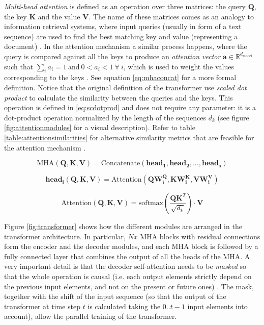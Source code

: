  \textit{Multi-head attention} is defined as an operation over three matrices: the query $\mathbf{Q}$, the key $\mathbf{K}$ and the value $\mathbf{V}$. The name of these matrices comes as an analogy to information retrieval systems, where input queries (usually in form of a text sequence) are used to find the best matching key and value (representing a document) \autocite{manning2008}. In the attention mechanism a similar process happens, where the query is compared against all the keys to produce an \textit{attention vector} $\mathbf{a} \in \mathbb{R}^{d_{\mathrm{model}}}$ such that $\sum_{i} a_i = 1\ \mathrm{and}\ 0<a_i<1\ \forall\ i$, which is used to weight the values corresponding to the keys \autocite{vaswani2017}. See equation \ref{eq:mhaconcat} for a more formal definition. Notice that the original definition of the transformer \autocite{vaswani2017} use \textit{scaled dot product}  to calculate the similarity between the queries and the keys. This operation is defined in \ref{eq:scdotprod} and does not require any parameter: it is a dot-product operation normalized by the length of the sequences $d_k$ (see figure \ref{fig:attentionmodules} for a visual description). Refer to table \ref{table:attentionsimilarities} for alternative similarity metrics that are feasible for the attention mechanism \autocite{uday2019}.

 \begin{equation}
 \label{eq:mhaconcat}
 \mathrm{MHA}(\mathbf{Q, K, V}) = \mathrm{Concatenate}(\mathrm{\mathbf{head_1}},\mathrm{\mathbf{head_2}},...,\mathrm{\mathbf{head_s}})
 \end{equation}


 \begin{equation}
 \label{eq:headsdef}
 \mathrm{\mathbf{head_i}}(\mathbf{Q,K,V}) = \mathrm{Attention}(\mathbf{Q} \mathbf{W^Q_i}, \mathbf{K} \mathbf{W^K_i}, \mathbf{V} \mathbf{W^V_i})
 \end{equation}

 \begin{equation}
 \label{eq:scdotprod}
 \mathrm{Attention}(\mathbf{Q, K, V}) = \mathrm{softmax} \left(\frac{\mathbf{QK}^T}{\sqrt{d_k}}\right) \cdot \mathbf{V}
 \end{equation}



Figure \ref{fig:transformer} shows how the different modules are arranged in the transformer architecture. In particular, $Nx$ MHA blocks with residual connections form the encoder and the decoder modules, and each MHA block is followed by a fully connected layer that combines the output of all the heads of the MHA. A very important detail is that the decoder self-attention needs to be \textit{masked} so that the whole operation is causal (i.e. each output elements strictly depend on the previous input elements, and not on the present or future ones) \autocite{vaswani2017}. The mask, together with the shift of the input sequence (so that the output of the transformer at time step $t$ is calculated taking the $0..t-1$ input elements into account), allow the parallel training of the transformer.

